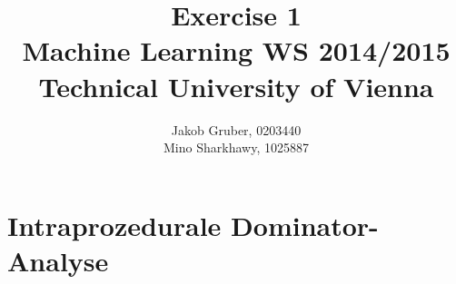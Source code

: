 \documentclass[a4paper,10pt]{article}
\title{Exercise 1 \\
       Machine Learning WS 2014/2015 \\
       Technical University of Vienna}
\author{Jakob Gruber, 0203440 \\
        Mino Sharkhawy, 1025887}
\begin{document}
\maketitle

\section{Intraprozedurale Dominator-Analyse}
\section{}
\section{}
\section{}
\section{}
\end{document}
